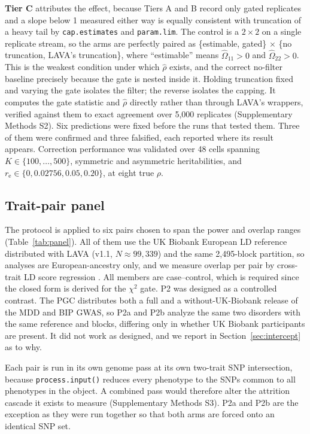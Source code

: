 \documentclass[12pt,a4paper]{article}
\newcommand{\rh}{\hat{\rho}}
\newcommand{\re}{r_{\mathrm{e}}}
\begin{document}
\textbf{Tier C} attributes the effect, because Tiers A and B record only gated replicates
and a slope below 1 measured either way is equally consistent with truncation of a heavy
tail by \texttt{cap.estimates} and \texttt{param.lim}. The control is a $2\times2$ on a
single replicate stream, so the arms are perfectly paired as \{estimable, gated\} $\times$
\{no truncation, LAVA's truncation\}, where ``estimable'' means $\hat\Omega_{11}>0$ and
$\hat\Omega_{22}>0$. This is the weakest condition under which $\rh$ exists, and the
correct no-filter baseline precisely because the gate is nested inside it. Holding
truncation fixed and varying the gate isolates the filter; the reverse isolates the
capping. It computes the gate statistic and $\rh$ directly rather than through LAVA's
wrappers, verified against them to exact agreement over 5,000 replicates (Supplementary
Methods S2). Six predictions were fixed before the runs that tested them. Three of them
were confirmed and three falsified, each reported where its result
appears. Correction performance was validated over 48 cells spanning
$K\in\{100,\dots,500\}$, symmetric and asymmetric heritabilities, and
$\re\in\{0,0.02756,0.05,0.20\}$, at eight true $\rho$.

\subsection{Trait-pair panel}\label{sec:paneldesign}

The protocol is applied to six pairs chosen to span the power and overlap ranges
(Table~\ref{tab:panel}). All of them use the UK Biobank European LD reference
distributed with LAVA (v1.1, $N\approx99{,}339$) and the same 2,495-block partition, so
analyses are European-ancestry only, and we measure overlap per pair by cross-trait LD
score regression \citep{ref6,ref7}. All members are case--control,
which is required since the closed form is derived for the
$\chi^2$ gate. P2 was designed as a controlled contrast. The PGC distributes both a full
and a without-UK-Biobank release of the MDD and BIP GWAS, so P2a and P2b analyze the same
two disorders with the same reference and blocks, differing only in whether UK Biobank
participants are present. It did not work as designed, and we report in
Section~\ref{sec:intercept} as to why.

Each pair is run in its own genome pass at its own two-trait SNP intersection, because
\texttt{process.input()} reduces every phenotype to the SNPs common to all phenotypes in
the object. A combined pass would therefore alter the attrition cascade it exists to
measure (Supplementary Methods S3). P2a and P2b are the exception as they were run
together so that both arms are forced onto an identical SNP set.
\end{document}
